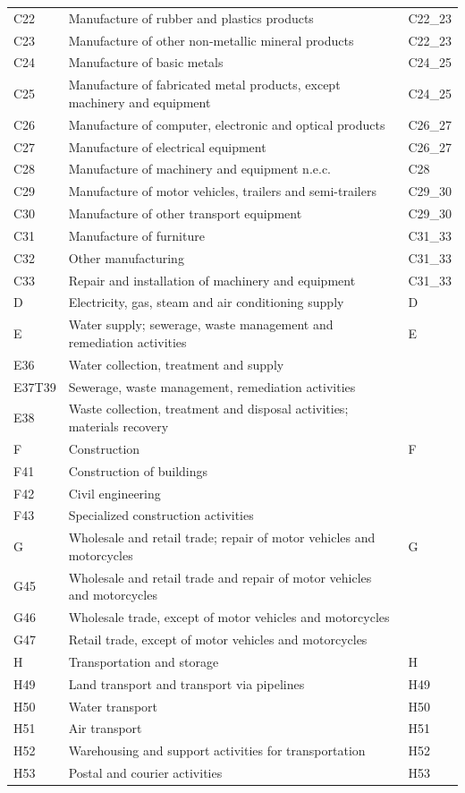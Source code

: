 \documentclass{article}
\begin{document}
\begin{tabularx}{\textwidth}{l X l}
C22     & Manufacture of rubber and plastics products & C22\_23 \\
C23     & Manufacture of other non-metallic mineral products & C22\_23 \\
C24     & Manufacture of basic metals & C24\_25 \\
C25     & Manufacture of fabricated metal products, except machinery and equipment & C24\_25 \\
C26     & Manufacture of computer, electronic and optical products & C26\_27 \\
C27     & Manufacture of electrical equipment & C26\_27 \\
C28     & Manufacture of machinery and equipment n.e.c. & C28 \\
C29     & Manufacture of motor vehicles, trailers and semi-trailers & C29\_30 \\
C30     & Manufacture of other transport equipment & C29\_30 \\
C31     & Manufacture of furniture & C31\_33 \\
C32     & Other manufacturing & C31\_33 \\
C33     & Repair and installation of machinery and equipment & C31\_33 \\
D       & Electricity, gas, steam and air conditioning supply & D \\
E       & Water supply; sewerage, waste management and remediation activities & E \\
E36     & Water collection, treatment and supply &  \\
E37T39  & Sewerage, waste management, remediation activities &  \\
E38     & Waste collection, treatment and disposal activities; materials recovery &  \\
F       & Construction & F \\
F41     & Construction of buildings &  \\
F42     & Civil engineering &  \\
F43     & Specialized construction activities &  \\
G       & Wholesale and retail trade; repair of motor vehicles and motorcycles & G \\
G45     & Wholesale and retail trade and repair of motor vehicles and motorcycles &  \\
G46     & Wholesale trade, except of motor vehicles and motorcycles &  \\
G47     & Retail trade, except of motor vehicles and motorcycles &  \\
H       & Transportation and storage & H \\
H49     & Land transport and transport via pipelines & H49 \\
H50     & Water transport & H50 \\
H51     & Air transport & H51 \\
H52     & Warehousing and support activities for transportation & H52 \\
H53     & Postal and courier activities & H53 \\
\hline
\end{tabularx}
\end{document}
